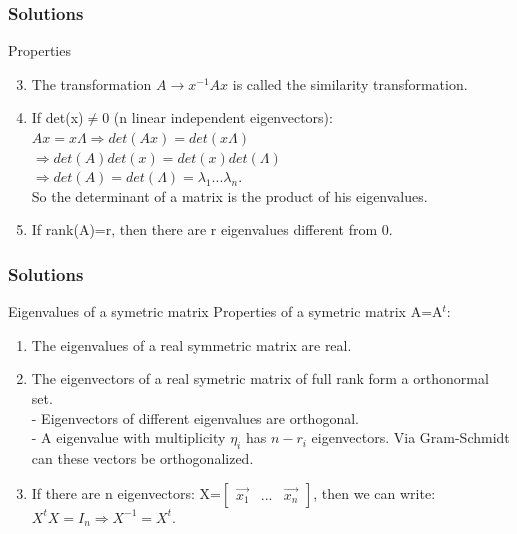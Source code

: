 \begin{frame}
	\frametitle{Solutions}
	\begin{block}{Properties}
		\begin{enumerate}
			\setcounter{enumi}{2}
			\item The transformation $A \rightarrow x^{-1}Ax$ is called the similarity transformation.
			\item If det(x)$\neq$0 (n linear independent eigenvectors): \\
			$Ax=x\Lambda \Rightarrow det(Ax)=det(x\Lambda)$\\
			$\Rightarrow det(A)det(x)=det(x)det(\Lambda)$\\ 
			$\Rightarrow det(A) = det(\Lambda)=\lambda_1...\lambda_n$. \\
			So the determinant of a matrix is the product of his eigenvalues. 
			\item If rank(A)=r, then there are r eigenvalues different from 0.
		\end{enumerate}
	\end{block}
\end{frame}

\begin{frame}
	\frametitle{Solutions}
	\begin{block}{Eigenvalues of a symetric matrix}
		Properties of a symetric matrix A=A$^t$:
		\begin{enumerate}
			\item The eigenvalues of a real symmetric matrix are real.
			\item The eigenvectors of a real symetric matrix of full rank form a orthonormal set.\\
			- Eigenvectors of different eigenvalues are orthogonal.\\
			- A eigenvalue with multiplicity $\eta_i$ has $n-r_i$ eigenvectors. Via Gram-Schmidt can these vectors be orthogonalized.
			\item If there are n eigenvectors: X=$\begin{bmatrix}
			\overrightarrow{x_1}& ... & \overrightarrow{x_n}
			\end{bmatrix}$, then we can write: $X^tX=I_n \Rightarrow X^{-1}=X^t$.
		\end{enumerate}
	\end{block}
\end{frame}

